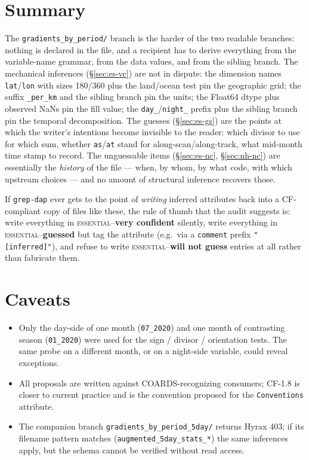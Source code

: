 \documentclass[11pt]{article}
\newcommand{\vc}{\textbf{very confident}}
\newcommand{\gs}{\textbf{guessed}}
\newcommand{\nc}{\textbf{will not guess}}
\newcommand{\es}{\textsc{essential}}
\begin{document}
\section{Summary}

The \texttt{gradients\_by\_period/} branch is the harder of the
two readable branches: nothing is declared in the file, and a
recipient has to derive everything from the variable-name grammar,
from the data values, and from the sibling branch. The mechanical
inferences (\S\ref{sec:es-vc}) are not in dispute: the dimension
names \texttt{lat}/\texttt{lon} with sizes 180/360 plus the
land/ocean test pin the geographic grid; the suffix
\texttt{\_per\_km} and the sibling branch pin the units; the
Float64 dtype plus observed NaNs pin the fill value; the
\texttt{day\_}/\texttt{night\_} prefix plus the sibling branch
pin the temporal decomposition. The guesses (\S\ref{sec:es-gs})
are the points at which the writer's intentions become invisible
to the reader: which divisor to use for which sum, whether
\texttt{as}/\texttt{at} stand for along-scan/along-track, what
mid-month time stamp to record. The unguessable items
(\S\ref{sec:es-nc}, \S\ref{sec:nh-nc}) are essentially the
\emph{history} of the file --- when, by whom, by what code, with
which upstream choices --- and no amount of structural inference
recovers those.

If \texttt{grep-dap} ever gets to the point of \emph{writing}
inferred attributes back into a CF-compliant copy of files like
these, the rule of thumb that the audit suggests is: write
everything in \es{}--\vc{} silently, write everything in
\es{}--\gs{} but tag the attribute (e.g.\ via a
\texttt{comment} prefix \texttt{"[inferred]"}), and refuse to
write \es{}--\nc{} entries at all rather than fabricate them.

\section{Caveats}

\begin{itemize}
  \item Only the day-side of one month (\texttt{07\_2020}) and
    one month of contrasting season (\texttt{01\_2020}) were
    used for the sign / divisor / orientation tests. The
    same probe on a different month, or on a night-side
    variable, could reveal exceptions.
  \item All proposals are written against COARDS-recognizing
    consumers; CF-1.8 is closer to current practice and is the
    convention proposed for the \texttt{Conventions} attribute.
  \item The companion branch \texttt{gradients\_by\_period\_5day/}
    returns Hyrax 403; if its filename pattern matches
    (\texttt{augmented\_5day\_stats\_*}) the same inferences
    apply, but the schema cannot be verified without read access.
\end{itemize}
\end{document}
